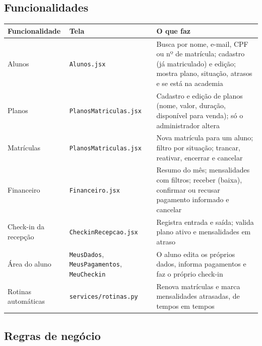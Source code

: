 \documentclass[11pt,a4paper,final]{article}
\newcommand{\cod}[1]{\texttt{#1}}
\begin{document}
\subsection{Funcionalidades}

\begin{xltabular}{\textwidth}{l l Y}
  \toprule
  \textbf{Funcionalidade} & \textbf{Tela} & \textbf{O que faz} \\
  \midrule
  \endhead
  Alunos                    & \cod{Alunos.jsx}             & Busca por nome, e-mail, CPF ou nº de matrícula; cadastro (já matriculado) e edição; mostra plano, situação, atrasos e se está na academia \\
  Planos                    & \cod{PlanosMatriculas.jsx}   & Cadastro e edição de planos (nome, valor, duração, disponível para venda); só o administrador altera \\
  Matrículas                & \cod{PlanosMatriculas.jsx}   & Nova matrícula para um aluno; filtro por situação; trancar, reativar, encerrar e cancelar \\
  Financeiro                & \cod{Financeiro.jsx}         & Resumo do mês; mensalidades com filtros; receber (baixa), confirmar ou recusar pagamento informado e cancelar \\
  Check-in da recepção      & \cod{CheckinRecepcao.jsx}    & Registra entrada e saída; valida plano ativo e mensalidades em atraso \\
  Área do aluno             & \cod{MeusDados}, \cod{MeusPagamentos}, \cod{MeuCheckin} & O aluno edita os próprios dados, informa pagamentos e faz o próprio check-in \\
  Rotinas automáticas       & \cod{services/rotinas.py}    & Renova matrículas e marca mensalidades atrasadas, de tempos em tempos \\
  \bottomrule
\end{xltabular}

\subsection{Regras de negócio}
\end{document}
